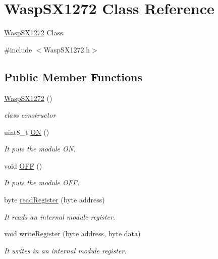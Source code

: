 \hypertarget{class_wasp_s_x1272}{}\section{Wasp\+S\+X1272 Class Reference}
\label{class_wasp_s_x1272}


\hyperlink{class_wasp_s_x1272}{Wasp\+S\+X1272} Class.  




{\ttfamily \#include $<$Wasp\+S\+X1272.\+h$>$}

\subsection*{Public Member Functions}
\begin{DoxyCompactItemize}
\item 
\hyperlink{class_wasp_s_x1272_aa461e1ac299e686241b130dada05e33f}{Wasp\+S\+X1272} ()
\begin{DoxyCompactList}\small\item\em class constructor \end{DoxyCompactList}\item 
uint8\+\_\+t \hyperlink{class_wasp_s_x1272_a03a4b5828167453c6c499721b9329546}{ON} ()
\begin{DoxyCompactList}\small\item\em It puts the module ON. \end{DoxyCompactList}\item 
void \hyperlink{class_wasp_s_x1272_a2f4aabfd219ec3ab7f3a6112c2ae1e7c}{O\+FF} ()
\begin{DoxyCompactList}\small\item\em It puts the module O\+FF. \end{DoxyCompactList}\item 
byte \hyperlink{class_wasp_s_x1272_adaab21595ee209e5cc354e197319fc26}{read\+Register} (byte address)
\begin{DoxyCompactList}\small\item\em It reads an internal module register. \end{DoxyCompactList}\item 
void \hyperlink{class_wasp_s_x1272_a50ea3e9a1f83ac5c328b45a460afa1eb}{write\+Register} (byte address, byte data)
\begin{DoxyCompactList}\small\item\em It writes in an internal module register. \end{DoxyCompactList}\item 

\end{DoxyCompactItemize}
